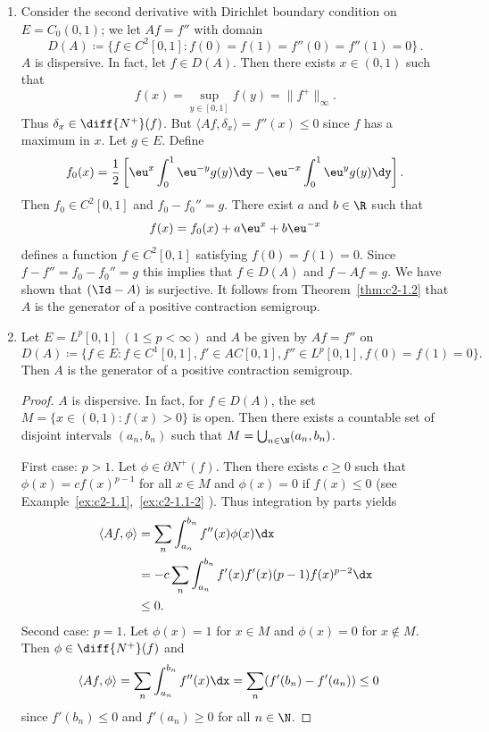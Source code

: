 \begin{examples}\label{ex:c2-1.5}
%
\begin{enumerate}[\upshape (i), wide, labelindent=.25em] %
\item \label{ex:c2-1.5-1}
Consider the second derivative with Dirichlet boundary condition on $E = C_{0}(0,1)$; \ie we let $Af = f''$ with domain 
\[
D(A) \coloneq \{f \in C^{2}[0,1] \colon f(0) = f(1) = f''(0) = f''(1) = 0\}\,.
\]
$A$ is dispersive. 
In fact, let $f \in D(A)$. 
Then there exists $x \in (0,1)$ such that 
\[
f(x) = \sup_{y \in [0,1]} f(y) = \|f^{+}\|_{\infty}.
\]
Thus $\delta_{x} \in \diff{N^{+}}(f)$. 
But $\langle Af,\delta_{x} \rangle = f''(x) \leq 0$ since $f$ has a maximum in $x$.
Let $g \in E$. 
Define 
\[
f_{0}(x) = \frac{1}{2} \left[\eu^{x} \int_{0}^{1} \eu^{-y}g(y) \dy - \eu^{-x} \int_{0}^{1} \eu^{y}g(y) \dy \right].
\]
Then $f_{0} \in C^{2}[0,1]$ and $f_{0} - f_{0}'' = g$. 
There exist $a$ and $ b \in \R$ such that 
%
\[
	f(x) = f_{0}(x) + a\eu^{x} + b\eu^{-x}
\]
%
defines a function $f \in C^{2}[0,1]$ satisfying $f(0) = f(1) = 0$. Since $f - f'' = f_{0} - f_{0}'' = g$ this implies that $f \in D(A)$ and $f - Af = g$. We have shown that $(\Id - A)$ is surjective. It follows from 
Theorem~\ref{thm:c2-1.2} that $A$ is the generator of a positive contraction semigroup.
\item \label{ex:c2-1.5-2}
Let $E = L^{p}[0,1]$ $(1 \leq p < \infty)$ and $A$ be given by $Af = f''$ on 
\[
D(A) \coloneq \{f \in E \colon f \in C^{1}[0,1], f' \in AC[0,1], f'' \in L^{p}[0,1], f(0) = f(1) = 0\}.
\]
Then $A$ is the generator of a positive contraction semigroup.
\begin{proof}
$A$ is dispersive. 
In fact, for $f \in D(A)$, the set $M = \{x \in (0,1) \colon f(x) > 0\}$ is open. Then there exists a countable set of disjoint intervals $(a_{n},b_{n})$ such that $M = \bigcup_{n \in \N} (a_{n},b_{n})$.

First case: $p > 1$.
Let $\phi \in \partial N^{+}(f)$. 
Then there exists $c \geq 0$ such that $\phi(x) = c f(x)^{p-1}$ for all $x \in M$ and $\phi(x) = 0$ if\/ $f(x) \leq 0$ (see Example~\ref{ex:c2-1.1},~\ref{ex:c2-1.1-2} ). 
Thus integration by parts yields
\begin{align*}
\langle Af,\phi \rangle &= \sum_{n} \int_{a_{n}}^{b_{n}} f''(x)\phi(x) \dx \\
&= -c \sum_{n} \int_{a_{n}}^{b_{n}} f'(x)f'(x) (p-1)f(x)^{p-2}  \dx \\
&\leq 0.
\end{align*}
Second case: $p = 1$.
Let $\phi(x) = 1$ for $x \in M$ and $\phi(x) = 0$ for $x \not\in M$. 
Then $\phi \in \diff{N^{+}}(f)$ and
\begin{align*}
\langle Af,\phi \rangle &= \sum_{n} \int_{a_{n}}^{b_{n}} f''(x) \dx = \sum_{n} (f'(b_{n}) - f'(a_{n})) \leq 0
\end{align*}
since $f'(b_{n}) \leq 0$ and $f'(a_{n}) \geq 0$ for all $n \in \N$.


\end{proof}
\end{enumerate}
\end{examples}
